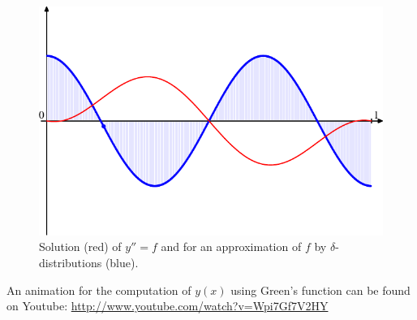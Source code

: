 \begin{beispiel}
\begin{figure}
\begin{center}
\includegraphics[width=0.7\hsize]{../common/graphics/green-1082.pdf}
\end{center}
\caption{Solution (red) of $y''=f$ and for an approximation of $f$ by
$\delta$-distributions (blue).
\label{elliptisch:green-beispiele}}
\end{figure}

An animation for the computation of $y(x)$ using Green's function
can be found on Youtube:
\url{http://www.youtube.com/watch?v=Wpi7Gf7V2HY}
\end{beispiel}

